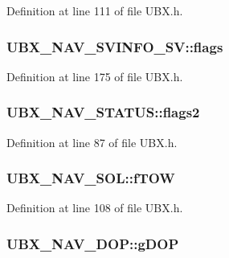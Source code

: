 Definition at line 111 of file U\-B\-X.\-h.

\hypertarget{group___g_s_p_module_gae645c4ae01edd4d7c5dffca7eb094aa3}{
\subsubsection[{flags}]{ U\-B\-X\-\_\-\-N\-A\-V\-\_\-\-S\-V\-I\-N\-F\-O\-\_\-\-S\-V\-::flags}}\label{group___g_s_p_module_gae645c4ae01edd4d7c5dffca7eb094aa3}


Definition at line 175 of file U\-B\-X.\-h.

\hypertarget{group___g_s_p_module_ga3e1ce741856096d697c3aafd6e66ac61}{
\subsubsection[{flags2}]{ U\-B\-X\-\_\-\-N\-A\-V\-\_\-\-S\-T\-A\-T\-U\-S\-::flags2}}\label{group___g_s_p_module_ga3e1ce741856096d697c3aafd6e66ac61}


Definition at line 87 of file U\-B\-X.\-h.

\hypertarget{group___g_s_p_module_ga7e73f1e4919dbde57008c9f9fad153cf}{
\subsubsection[{f\-T\-O\-W}]{ U\-B\-X\-\_\-\-N\-A\-V\-\_\-\-S\-O\-L\-::f\-T\-O\-W}}\label{group___g_s_p_module_ga7e73f1e4919dbde57008c9f9fad153cf}


Definition at line 108 of file U\-B\-X.\-h.

\hypertarget{group___g_s_p_module_ga2b2e6160322047b85f23f1cb527bc6fd}{
\subsubsection[{g\-D\-O\-P}]{ U\-B\-X\-\_\-\-N\-A\-V\-\_\-\-D\-O\-P\-::g\-D\-O\-P}}\label{group___g_s_p_module_ga2b2e6160322047b85f23f1cb527bc6fd}


